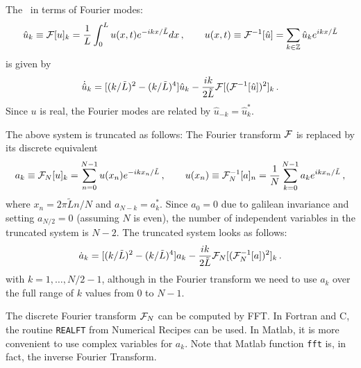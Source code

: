 {The \KSe\ in terms of Fourier modes:
\begin{equation}
  \hat{u}_k \equiv {\cal F}[u]_k = \frac{1}{L}\int_0^L u(x,t) e^{-ikx/\tilde{L}}dx\,,
  \qquad u(x,t) \equiv {\cal F}^{-1}[\hat{u}] = \sum_{k\in{\mathbb Z}} \hat{u}_k e^{ikx/\tilde{L}}
\end{equation}
 is given by
\begin{equation}
  \dot{\hat{u}}_k =[(k/\tilde{L})^2-(k/\tilde{L})^4]\hat{u}_k -
  \frac{ik}{2\tilde{L}}{\cal F}[({\cal F}^{-1}[\hat{u}])^2]_k\,.
\end{equation}
Since $u$ is real, the Fourier modes are related by $\hat{u}_{-k} =
\hat{u}^\ast_k$.

The above system is truncated as follows: The Fourier transform
${\cal F}$ is replaced by its discrete equivalent
\begin{equation}
  a_k \equiv {\cal F}_N[u]_k = \sum_{n = 0}^{N-1} u(x_n)
  e^{-ikx_n/\tilde{L}}\,,\qquad u(x_n) \equiv {\cal F}_N^{-1}[a]_n
  = \frac{1}{N}\sum_{k = 0}^{N-1} a_k e^{ikx_n/\tilde{L}}\,,
\end{equation}
where $x_n = 2\pi\tilde{L}n/N$ and $a_{N-k} = a^\ast_k$.  Since $a_0
= 0$ due to galilean invariance and setting $a_{N/2} = 0$ (assuming
$N$ is even), the number of independent variables in the truncated
system is $N-2$.  The truncated system looks as follows:
\begin{equation}
  \dot{a}_k =[(k/\tilde{L})^2-(k/\tilde{L})^4]a_k -
  \frac{ik}{2\tilde{L}}{\cal F}_N[({\cal F}_N^{-1}[a])^2]_k\,.
\end{equation}
with $k = 1,\ldots,N/2-1$, although in the Fourier transform we need
to use $a_k$ over the full range of $k$ values from 0 to $N-1$.

The discrete Fourier transform ${\cal F}_N$ can be computed by FFT.
In Fortran and C, the routine {\tt REALFT} from Numerical Recipes
can be used.  In Matlab, it is more convenient to use complex
variables for $a_k$.  Note that Matlab function {\tt fft} is, in
fact, the inverse Fourier Transform.

}
